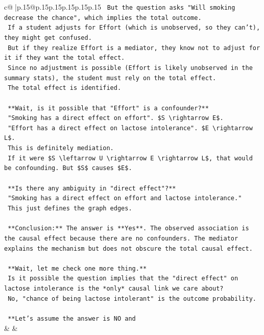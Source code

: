 \documentclass{article}
\begin{document}
{\begin{supertabular}{c@{$\;$}|p{.15\linewidth}@{}p{.15\linewidth}p{.15\linewidth}p{.15\linewidth}p{.15\linewidth}p{.15\linewidth}}
{{{\texttt{    But the question asks "Will smoking decrease the chance", which implies the total outcome.} \\
\texttt{    If a student adjusts for Effort (which is unobserved, so they can't), they might get confused.} \\
\texttt{    But if they realize Effort is a mediator, they know not to adjust for it if they want the total effect.} \\
\texttt{    Since no adjustment is possible (Effort is likely unobserved in the summary stats), the student must rely on the total effect.} \\
\texttt{    The total effect is identified.} \\
\\ 
\texttt{    **Wait, is it possible that "Effort" is a confounder?**} \\
\texttt{    "Smoking has a direct effect on effort". \$S \textbackslash{}rightarrow E\$.} \\
\texttt{    "Effort has a direct effect on lactose intolerance". \$E \textbackslash{}rightarrow L\$.} \\
\texttt{    This is definitely mediation.} \\
\texttt{    If it were \$S \textbackslash{}leftarrow U \textbackslash{}rightarrow E \textbackslash{}rightarrow L\$, that would be confounding. But \$S\$ causes \$E\$.} \\
\\ 
\texttt{    **Is there any ambiguity in "direct effect"?**} \\
\texttt{    "Smoking has a direct effect on effort and lactose intolerance."} \\
\texttt{    This just defines the graph edges.} \\
\\ 
\texttt{    **Conclusion:** The answer is **Yes**. The observed association is the causal effect because there are no confounders. The mediator explains the mechanism but does not obscure the total causal effect.} \\
\\ 
\texttt{    **Wait, let me check one more thing.**} \\
\texttt{    Is it possible the question implies that the "direct effect" on lactose intolerance is the *only* causal link we care about?} \\
\texttt{    No, "chance of being lactose intolerant" is the outcome probability.} \\
\\ 
\texttt{    **Let's assume the answer is NO and} \\
            }
        }
    }
    & & \\ \\


\end{supertabular}}
\end{document}
